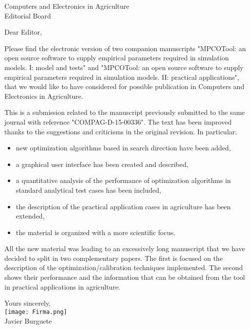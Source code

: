 \documentclass{letter}
\begin{document}
\begin{letter}{Computers and Electronics in Agriculture\\       %
Editorial Board
}

\opening{Dear Editor,}     %



Please find the electronic version of two companion manuscripts "MPCOTool: an open source software to supply empirical parameters
required in simulation models. I: model and tests" and "MPCOTool: an open source software to supply empirical parameters
required in simulation models. II: practical applications", that we would like to have considered for possible publication in
Computers and Electronics in Agriculture.

This is a submission related to the manuscript previously submitted to the same journal with reference "COMPAG-D-15-00336". The text
has been improved thanks to the suggestions and criticisms in the original revision. In particular:
\begin{itemize}
\item new optimization algorithms based in search direction have been added,
\item a graphical user interface has been created and described,
\item a quantitative analysis of the performance of optimization algorithms in standard analytical test cases has been included,
\item the description of the practical application cases in agriculture has been extended,
\item the material is organized with a more scientific focus.
\end{itemize}

All the new material was leading to an excessively long manuscript that we have decided to split in two complementary papers. The first 
is focused on the description of the optimization/calibration techniques implemented. The second shows their performance and the
information that can be obtained from the tool in practical applications in agriculture.



\begin{center}
Yours sincerely, \\
\texttt{[image: Firma.png]}\\
Javier Burguete
\end{center}

\end{letter}
\end{document}
